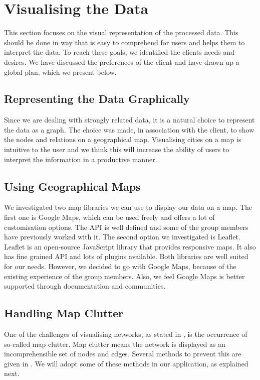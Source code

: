 \section{Visualising the Data}

This section focuses on the visual representation of the processed data. This should be done in way that is easy to comprehend for users and helps them to interpret the data. To reach these goals, we identified the clients needs and desires. We have discussed the preferences of the client and have drawn up a global plan, which we present below.

\subsection{Representing the Data Graphically}

Since we are dealing with strongly related data, it is a natural choice to represent the data as a graph. The choice was made, in association with the client, to show the nodes and relations on a geographical map. Visualising cities on a map is intuitive to the user and we think this will increase the ability of users to interpret the information in a productive manner.

\subsection{Using Geographical Maps}

We investigated two map libraries we can use to display our data on a map. The first one is Google Maps, which can be used freely and offers a lot of customisation options. The API is well defined and some of the group members have previously worked with it. The second option we investigated is Leaflet. Leaflet is an open-source JavaScript library that provides responsive maps. It also has fine grained API and lots of plugins available.
Both libraries are well suited for our needs. However, we decided to go with Google Maps, because of the existing experience of the group members. Also, we feel Google Maps is better supported through documentation and communities.

\subsection{Handling Map Clutter}

One of the challenges of visualising networks, as stated in \cite{468391}, is the occurrence of so-called map clutter. Map clutter means the network is displayed as an incomprehensible set of nodes and edges.
Several methods to prevent this are given in \cite{468391}. We will adopt some of these methods in our application, as explained next.


